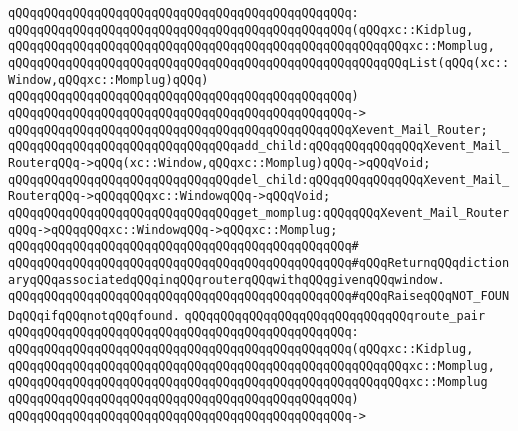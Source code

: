 \verb|qQQqqQQqqQQqqQQqqQQqqQQqqQQqqQQqqQQqqQQqqQQqqQQq:|\newline
\verb|qQQqqQQqqQQqqQQqqQQqqQQqqQQqqQQqqQQqqQQqqQQqqQQq(qQQqxc::Kidplug,|\newline
\verb|qQQqqQQqqQQqqQQqqQQqqQQqqQQqqQQqqQQqqQQqqQQqqQQqqQQqqQQqxc::Momplug,|\newline
\verb|qQQqqQQqqQQqqQQqqQQqqQQqqQQqqQQqqQQqqQQqqQQqqQQqqQQqqQQqList(qQQq(xc::Window,qQQqxc::Momplug)qQQq)|\newline
\verb|qQQqqQQqqQQqqQQqqQQqqQQqqQQqqQQqqQQqqQQqqQQqqQQq)|\newline
\verb|qQQqqQQqqQQqqQQqqQQqqQQqqQQqqQQqqQQqqQQqqQQqqQQq->|\newline
\verb|qQQqqQQqqQQqqQQqqQQqqQQqqQQqqQQqqQQqqQQqqQQqqQQqXevent_Mail_Router;|\newline
\newline
\verb|qQQqqQQqqQQqqQQqqQQqqQQqqQQqqQQqadd_child:qQQqqQQqqQQqqQQqXevent_Mail_RouterqQQq->qQQq(xc::Window,qQQqxc::Momplug)qQQq->qQQqVoid;|\newline
\verb|qQQqqQQqqQQqqQQqqQQqqQQqqQQqqQQqdel_child:qQQqqQQqqQQqqQQqXevent_Mail_RouterqQQq->qQQqqQQqxc::WindowqQQq->qQQqVoid;|\newline
\verb|qQQqqQQqqQQqqQQqqQQqqQQqqQQqqQQqget_momplug:qQQqqQQqXevent_Mail_RouterqQQq->qQQqqQQqxc::WindowqQQq->qQQqxc::Momplug;|\newline
\verb|qQQqqQQqqQQqqQQqqQQqqQQqqQQqqQQqqQQqqQQqqQQqqQQq#|\newline
\verb|qQQqqQQqqQQqqQQqqQQqqQQqqQQqqQQqqQQqqQQqqQQqqQQq#qQQqReturnqQQqdictionaryqQQqassociatedqQQqinqQQqrouterqQQqwithqQQqgivenqQQqwindow.|\newline
\verb|qQQqqQQqqQQqqQQqqQQqqQQqqQQqqQQqqQQqqQQqqQQqqQQq#qQQqRaiseqQQqNOT_FOUNDqQQqifqQQqnotqQQqfound.|\newline
\newline
\verb|qQQqqQQqqQQqqQQqqQQqqQQqqQQqqQQqroute_pair|\newline
\verb|qQQqqQQqqQQqqQQqqQQqqQQqqQQqqQQqqQQqqQQqqQQqqQQq:|\newline
\verb|qQQqqQQqqQQqqQQqqQQqqQQqqQQqqQQqqQQqqQQqqQQqqQQq(qQQqxc::Kidplug,|\newline
\verb|qQQqqQQqqQQqqQQqqQQqqQQqqQQqqQQqqQQqqQQqqQQqqQQqqQQqqQQqxc::Momplug,|\newline
\verb|qQQqqQQqqQQqqQQqqQQqqQQqqQQqqQQqqQQqqQQqqQQqqQQqqQQqqQQqxc::Momplug|\newline
\verb|qQQqqQQqqQQqqQQqqQQqqQQqqQQqqQQqqQQqqQQqqQQqqQQq)|\newline
\verb|qQQqqQQqqQQqqQQqqQQqqQQqqQQqqQQqqQQqqQQqqQQqqQQq->|\newline

